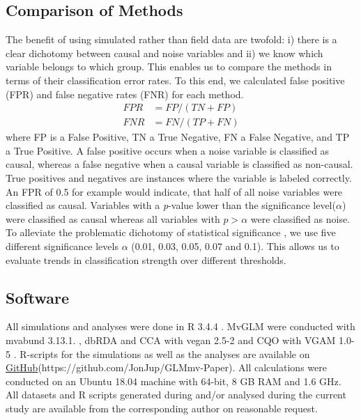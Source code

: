 \documentclass[a4paper,11pt]{article}
\begin{document}
	\subsection{Comparison of Methods}
        The benefit of using simulated rather than field data are twofold:
        i) there is a clear dichotomy between causal and noise variables and 
        ii) we know which variable belongs to which group. 
        This enables us to compare the methods in terms of their classification error rates.
        To this end, we calculated false positive (FPR) and false negative rates (FNR) for each method.
        \begin{align}
           FPR &= FP /(TN + FP) \\        
           FNR &=  FN / (TP + FN)
        \end{align}
        where FP is a False Positive, TN a True Negative, FN a False Negative, and TP a True Positive. 
        A false positive occurs when a noise variable is classified as causal, whereas a false negative when a causal variable is classified as non-causal. 
        True positives and negatives are instances where the variable is labeled correctly. 
        An FPR of 0.5 for example would indicate, that half of all noise variables were classified as causal. 
        Variables with a \textit{p}-value lower than the significance level($\alpha$) were classified as causal whereas all variables with $p > \alpha $  were classified as noise.
        To alleviate the problematic dichotomy of statistical significance \citep{Greenland2016}, we use five different significance levels $\alpha$ (0.01, 0.03, 0.05, 0.07 and 0.1).
		This allows us to evaluate trends in classification strength over different thresholds. 
        

	\subsection{Software}
		All simulations and analyses were done in R 3.4.4 \citep{RCT2018}.
		MvGLM were conducted with mvabund 3.13.1. \citep{Wang2019}, dbRDA and CCA with vegan 2.5-2 \citep{Oksanen2018} and CQO with VGAM 1.0-5 \citep{VGAM19}. 
		R-scripts for the simulations as well as the analyses are available on \href{https://github.com/JonJup/GLMmv-Paper} {GitHub}(https://github.com/JonJup/GLMmv-Paper).
		All calculations were conducted on an Ubuntu 18.04 machine with 64-bit, 8 GB RAM and 1.6 GHz.\\
		All datasets and R scripts generated during and/or analysed during the current study are available from the corresponding author on reasonable request.
\end{document}
